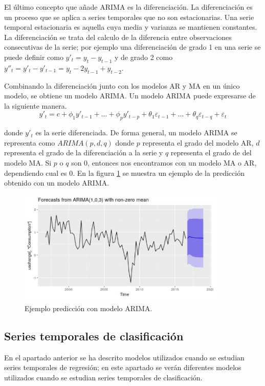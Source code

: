 El último concepto que añade ARIMA es la diferenciación. La diferenciación es un proceso que se aplica a series temporales que no son estacionarias. Una serie temporal estacionaria es aquella cuya media y varianza se mantienen constantes. La diferenciación se trata del calculo de la diferencia entre observaciones consecutivas de la serie; por ejemplo una diferenciación de grado 1 en una serie se puede definir como $ y'_t = y_t - y_{t-1}$ y de grado 2 como $y''_t = y'_t - y'_{t-1} = y_t - 2y_{t-1} + y_{t-2}$.\newline

Combinando la diferenciación junto con los modelos AR y MA en un único modelo, se obtiene un modelo ARIMA. Un modelo ARIMA puede expresarse de la siguiente manera.
$$ y'_t = c + \phi_1 y'_{t-1} + ... + \phi_p y'_{t-p} + \theta_1 \varepsilon_{t-1} + ... + \theta_q \varepsilon_{t-q} + \varepsilon_t $$

\noindent donde $y'_t$ es la serie diferenciada. De forma general, un modelo ARIMA se representa como $ARIMA(p,d,q)$ donde $p$ representa el grado del modelo AR, $d$ representa el grado de la diferenciación a la serie y $q$ representa el grado de del modelo MA. Si $p$ o $q$ son 0, entonces nos encontramos con un modelo MA o AR, dependiendo cual es 0. En la figura \ref{fig:213} se muestra un ejemplo de la predicción obtenido con un modelo ARIMA.\newline

\begin{figure}[H]
	\centering
	\includegraphics[width=100mm]{imagenes/arima_example.png}
	\caption{Ejemplo predicción con modelo ARIMA.}
	\label{fig:213}
\end{figure}
\subsection{Series temporales de clasificación}
En el apartado anterior se ha descrito modelos utilizados cuando se estudian series temporales de regresión; en este apartado se verán diferentes modelos utilizados cuando se estudian series temporales de clasificación.\newline

